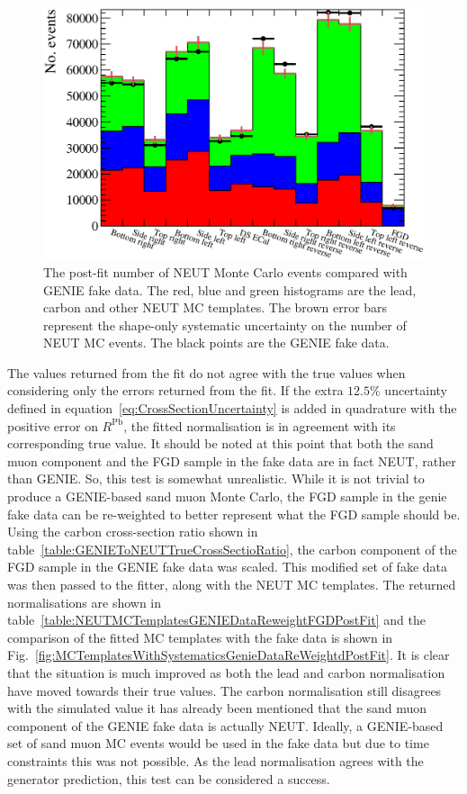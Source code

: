 \begin{figure}
  \centering
  \includegraphics[width=15cm]{images/measurement/validation/genie/MCTemplatesWithSystematics_GenieData_PostFit.eps}
  \caption{The post-fit number of NEUT Monte Carlo events compared with GENIE fake data.  The red, blue and green histograms are the lead, carbon and other NEUT MC templates.  The brown error bars represent the shape-only systematic uncertainty on the number of NEUT MC events.  The black points are the GENIE fake data.}
  \label{fig:MCTemplatesWithSystematicsGenieDataPostFit}
\end{figure}
\newline
\newline
The values returned from the fit do not agree with the true values when considering only the errors returned from the fit.  If the extra $12.5\%$ uncertainty defined in equation~\ref{eq:CrossSectionUncertainty} is added in quadrature with the positive error on $R^{\textrm{Pb}}$, the fitted normalisation is in agreement with its corresponding true value.  It should be noted at this point that both the sand muon component and the FGD sample in the fake data are in fact NEUT, rather than GENIE.  So, this test is somewhat unrealistic.  While it is not trivial to produce a GENIE-based sand muon Monte Carlo, the FGD sample in the genie fake data can be re-weighted to better represent what the FGD sample should be.  Using the carbon cross-section ratio shown in table~\ref{table:GENIEToNEUTTrueCrossSectioRatio}, the carbon component of the FGD sample in the GENIE fake data was scaled.  This modified set of fake data was then passed to the fitter, along with the NEUT MC templates.  The returned normalisations are shown in table~\ref{table:NEUTMCTemplatesGENIEDataReweightFGDPostFit} and the comparison of the fitted MC templates with the fake data is shown in Fig.~\ref{fig:MCTemplatesWithSystematicsGenieDataReWeightdPostFit}.  It is clear that the situation is much improved as both the lead and carbon normalisation have moved towards their true values.  The carbon normalisation still disagrees with the simulated value it has already been mentioned that the sand muon component of the GENIE fake data is actually NEUT.  Ideally, a GENIE-based set of sand muon MC events would be used in the fake data but due to time constraints this was not possible.  As the lead normalisation agrees with the generator prediction, this test can be considered a success.

